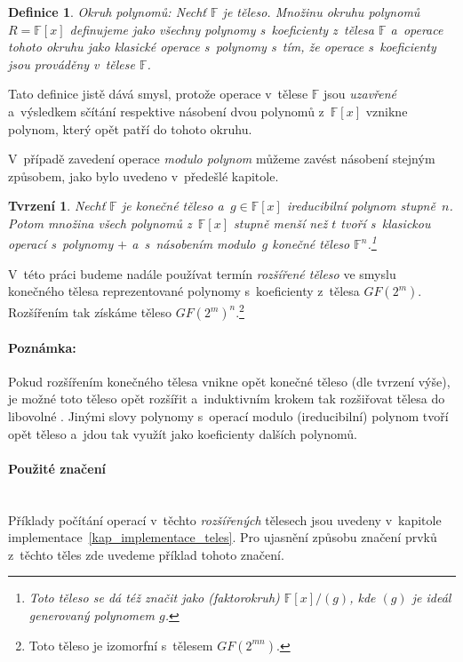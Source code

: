 \documentclass[thesis=M,czech,hidelinks]{FITthesis}[2012/06/26]
\newcommand{\0}{{\textcolor[gray]{0.75}{0}}}
\newtheorem{tvrzeni}{Tvrzení}
\newtheorem{definice}{Definice}
\begin{document}
\begin{definice}{Okruh polynomů:}
    Nechť $\mathbb{F}$ je těleso. Množinu okruhu polynomů $R = \mathbb{F}[x]$
    definujeme jako všechny polynomy s~koeficienty z~tělesa $\mathbb{F}$
    a~operace tohoto okruhu jako klasické operace s~polynomy s~tím, že operace
    s~koeficienty jsou prováděny v~tělese $\mathbb{F}$.
\end{definice}

Tato definice jistě dává smysl, protože operace v~tělese $\mathbb{F}$ jsou
\emph{uzavřené} a~výsledkem sčítání respektive násobení dvou polynomů
z~$\mathbb{F}[x]$ vznikne polynom, který opět patří do tohoto okruhu.

V~případě zavedení operace \emph{modulo polynom} můžeme zavést násobení stejným
způsobem, jako bylo uvedeno v~předešlé kapitole.

\begin{tvrzeni}
    Nechť $\mathbb{F}$ je konečné těleso a~$g \in \mathbb{F}[x]$ \emph{ireducibilní}
    polynom stupně~$n$. Potom množina všech polynomů z~$\mathbb{F}[x]$ stupně
    menší než $t$ tvoří s~klasickou operací s~polynomy $+$ a~s~násobením
    modulo~$g$ \emph{konečné těleso} $\mathbb{F}^n$.\footnote{
        Toto těleso se dá též značit jako (faktorokruh) $\mathbb{F}[x]/(g)$, kde
        $(g)$ je \emph{ideál} generovaný polynomem $g$.
    }
\end{tvrzeni}

V~této práci budeme nadále používat termín \emph{rozšířené těleso} ve smyslu
konečného tělesa reprezentované polynomy s~koeficienty z~tělesa $GF(2^m)$.
Rozšířením tak získáme těleso $GF(2^m)^n$.\footnote{
    Toto těleso je izomorfní s~tělesem  $GF(2^{mn})$.
}


\paragraph{Poznámka:} Pokud rozšířením konečného tělesa vnikne opět konečné
těleso (dle tvrzení výše), je možné toto těleso opět rozšířit a~induktivním
krokem tak rozšiřovat tělesa do libovolné . Jinými slovy polynomy
s~operací modulo (ireducibilní) polynom tvoří opět těleso a~jdou tak využít jako
koeficienty dalších polynomů.


\paragraph{Použité značení} \hfil \\
Příklady počítání operací v~těchto \emph{rozšířených} tělesech jsou uvedeny
v~kapitole implementace~\ref{kap_implementace_teles}. Pro ujasnění způsobu
značení prvků z~těchto těles zde uvedeme příklad tohoto značení.
\end{document}
